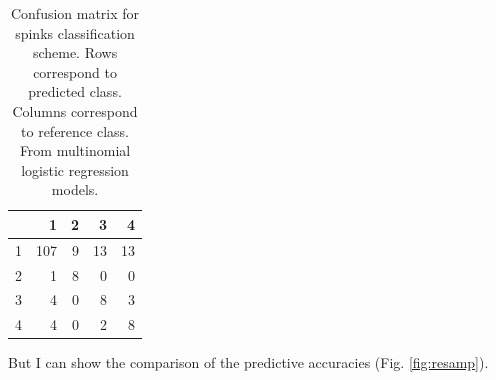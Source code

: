\documentclass{article}\usepackage{graphicx, color}
\begin{document}
\begin{table}[ht]
\begin{center}
\begin{tabular}{rrrrr}
  \hline
 & 1 & 2 & 3 & 4 \\ 
  \hline
1 & 107 &   9 &  13 &  13 \\ 
  2 &   1 &   8 &   0 &   0 \\ 
  3 &   4 &   0 &   8 &   3 \\ 
  4 &   4 &   0 &   2 &   8 \\ 
   \hline
\end{tabular}
\caption{Confusion matrix for spinks classification scheme. Rows correspond to predicted class. Columns correspond to reference class. From multinomial logistic regression models.}
\label{tab:multi-conf-spinks}
\end{center}
\end{table}



But I can show the comparison of the predictive accuracies (Fig. \ref{fig:resamp}).
\end{document}
